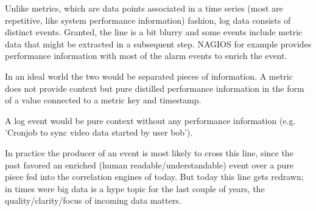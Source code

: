 Unlike metrics, which are data points associated in a time series (most are repetitive, like system performance information)
fashion, log data consists of distinct events. Granted, the line is a bit blurry and some events include metric data that
might be extracted in a subsequent step. NAGIOS for example provides performance information with most of the alarm events to enrich the event.

In an ideal world the two would be separated pieces of information. A metric does not provide context
but pure distilled performance information in the form of a value connected to a metric key and timestamp.

A log event would be pure context without any performance information (e.g. 'Cronjob to sync video data started by user bob'). 

In practice the producer of an event is most likely to cross this line, since the past favored an enriched (human readable/understandable) event over a
pure piece fed into the correlation engines of today. But today this line gets redrawn; in times were big data is a hype topic for the last couple
of years, the quality/clarity/focus of incoming data matters.
